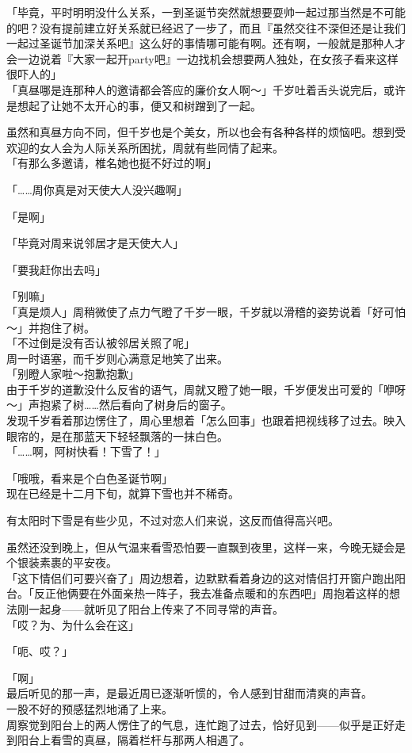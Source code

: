 「毕竟，平时明明没什么关系，一到圣诞节突然就想要耍帅一起过那当然是不可能的吧？没有提前建立好关系就已经迟了一步了，而且『虽然交往不深但还是让我们一起过圣诞节加深关系吧』这么好的事情哪可能有啊。还有啊，一般就是那种人才会一边说着『大家一起开party吧』一边找机会想要两人独处，在女孩子看来这样很吓人的」\\

「真昼哪是连那种人的邀请都会答应的廉价女人啊～」千岁吐着舌头说完后，或许是想起了让她不太开心的事，便又和树蹭到了一起。

虽然和真昼方向不同，但千岁也是个美女，所以也会有各种各样的烦恼吧。想到受欢迎的女人会为人际关系所困扰，周就有些同情了起来。\\

「有那么多邀请，椎名她也挺不好过的啊」

「……周你真是对天使大人没兴趣啊」

「是啊」

「毕竟对周来说邻居才是天使大人」

「要我赶你出去吗」

「别嘛」\\

「真是烦人」周稍微使了点力气瞪了千岁一眼，千岁就以滑稽的姿势说着「好可怕～」并抱住了树。\\

「不过倒是没有否认被邻居关照了呢」\\

周一时语塞，而千岁则心满意足地笑了出来。\\

「别瞪人家啦～抱歉抱歉」\\

由于千岁的道歉没什么反省的语气，周就又瞪了她一眼，千岁便发出可爱的「咿呀～」声抱紧了树……然后看向了树身后的窗子。\\

发现千岁看着那边愣住了，周心里想着「怎么回事」也跟着把视线移了过去。映入眼帘的，是在那蓝天下轻轻飘落的一抹白色。\\

「……啊，阿树快看！下雪了！」

「哦哦，看来是个白色圣诞节啊」\\

现在已经是十二月下旬，就算下雪也并不稀奇。

有太阳时下雪是有些少见，不过对恋人们来说，这反而值得高兴吧。

虽然还没到晚上，但从气温来看雪恐怕要一直飘到夜里，这样一来，今晚无疑会是个银装素裹的平安夜。\\

「这下情侣们可要兴奋了」周边想着，边默默看着身边的这对情侣打开窗户跑出阳台。「反正他俩要在外面亲热一阵子，我去准备点暖和的东西吧」周抱着这样的想法刚一起身——就听见了阳台上传来了不同寻常的声音。\\

「哎？为、为什么会在这」

「呃、哎？」

「啊」\\

最后听见的那一声，是最近周已逐渐听惯的，令人感到甘甜而清爽的声音。\\

一股不好的预感猛烈地涌了上来。\\

周察觉到阳台上的两人愣住了的气息，连忙跑了过去，恰好见到——似乎是正好走到阳台上看雪的真昼，隔着栏杆与那两人相遇了。
